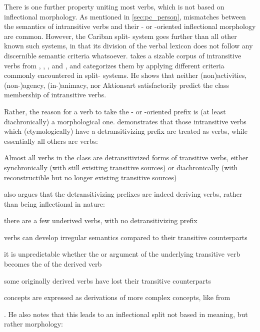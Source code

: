 

There is one further property uniting most  verbs, which is not based on inflectional morphology.
As mentioned in \cref{sec:pc_person}, mismatches between the semantics of intransitive verbs and their - or -oriented inflectional morphology are common.
However, the Cariban split- system goes further than all other known such systems, in that its division of the verbal lexicon does not follow any discernible semantic criteria whatsoever.
\textcite{meira2000split} takes a sizable corpus of intransitive verbs from \trio, \kalina, \apalai, and \wayana, and categorizes them by applying different criteria commonly encountered in split- systems.
He shows that neither (non\-)activities, %
(non-)agency, %
(in-)animacy, %
nor Aktionsart %
satisfactorily predict the class membership of intransitive verbs.

Rather, the reason for a verb to take the - or -oriented prefix is (at least diachronically) a morphological one.
\textcite[217--221]{meira2000split} demonstrates that those intransitive verbs which (etymologically) have a detransitivizing prefix are treated as  verbs, while essentially all others are  verbs:
\begin{quotebox}{\parencite[201]{meira2000split}}
	Almost all verbs in the  class are detransitivized forms of transitive verbs, either synchronically (with still exisiting transitive sources) or diachronically (with reconstructible but no longer existing transitive sources)
\end{quotebox}
\textcite[221--223]{meira2000split} also argues that the detransitivizing prefixes are indeed deriving  verbs, rather than being inflectional in nature:
\begin{inlinelist}
	\item there are a few underived  verbs, with no detransitivizing prefix
	\item {} verbs can develop irregular semantics compared to their transitive counterparts
	\item it is unpredictable whether the  or  argument of the underlying transitive verb becomes the  of the derived  verb
	\item some originally derived  verbs have lost their transitive counterparts
	\item {} concepts are expressed as derivations of more complex concepts, like  from 
\end{inlinelist}.
He also notes that this leads to an inflectional split not based in meaning, but rather morphology:

